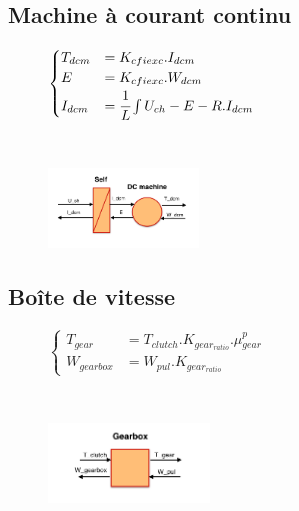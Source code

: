 \subsection{Machine à courant continu}
\vspace{-10px}
\begin{figure}[ht]
\centering
\begin{minipage}{.5\textwidth}  
\centering
$\begin{cases}
	 T_{dcm} &= K_{cfiexc}.I_{dcm}\\
	E &= K_{cfiexc}.W_{dcm}\\
	I_{dcm} &= \cfrac{1}{L}\int{U_{ch}-E-R.I_{dcm}}	
\end{cases}$
\end{minipage}~
\begin{minipage}{.5\textwidth}
  \centering
\includegraphics[height=80px]{images/MCC.png}
\end{minipage}
\end{figure}
\FloatBarrier
\vspace{-20px}

\subsection{Boîte de vitesse}
\vspace{-10px}
\begin{figure}[ht]
\centering
\begin{minipage}{.5\textwidth}  
\centering
$\begin{cases}
	 T_{gear} &= T_{clutch}.K_{gear_{ratio}}.\mu{}_{gear}^{p}\\
	W_{gearbox} &= W_{pul}.K_{gear_{ratio}}
\end{cases}$
\end{minipage}~
\begin{minipage}{.5\textwidth}
  \centering
\includegraphics[height=80px]{images/Gearbox.png}
\end{minipage}
\end{figure}
\FloatBarrier
\vspace{-20px}

